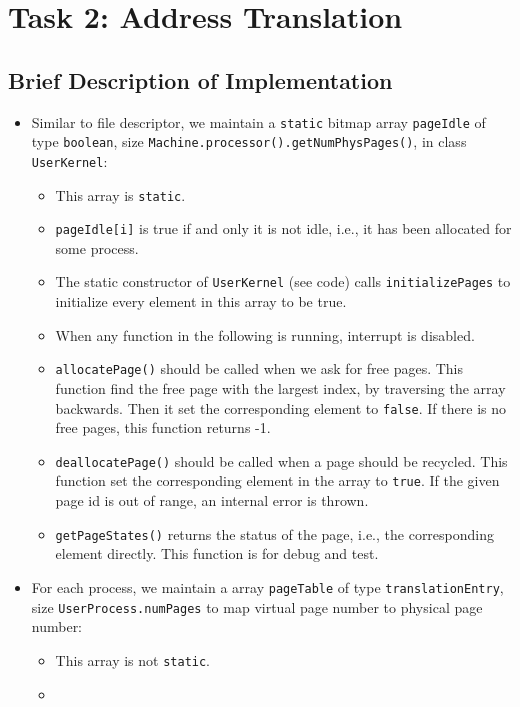 \documentclass{article}
\begin{document}
\section{Task 2: Address Translation}

\subsection{Brief Description of Implementation}

\begin{itemize}
\item
Similar to file descriptor, we maintain a \texttt{static} bitmap array \texttt{pageIdle} of type \texttt{boolean}, size \texttt{Machine.processor().getNumPhysPages()}, in class \texttt{UserKernel}:
	\begin{itemize}
	\item
	This array is \texttt{static}.
	\item
	\texttt{pageIdle[i]} is true if and only it is not idle, i.e., it has been allocated for some process.
	\item
	The static constructor of \texttt{UserKernel} (see code) calls \texttt{initializePages} to initialize every element in this array to be true.
	\item
	When any function in the following is running, interrupt is disabled.
	\item
	\texttt{allocatePage()} should be called when we ask for free pages.
	This function find the free page with the largest index, by traversing the array backwards. Then it set the corresponding element to \texttt{false}.
	If there is no free pages, this function returns -1.
	\item
	\texttt{deallocatePage()} should be called when a page should be recycled.
	This function set the corresponding element in the array to \texttt{true}.
	If the given page id is out of range, an internal error is thrown.
	\item
	\texttt{getPageStates()} returns the status of the page, i.e., the corresponding element directly.
	This function is for debug and test.
	\end{itemize}
\item
For each process, we maintain a array \texttt{pageTable} of type \texttt{translationEntry}, size \texttt{UserProcess.numPages} to map virtual page number to physical page number:
	\begin{itemize}
	\item
	This array is not \texttt{static}.
	\item

\end{itemize}
\end{itemize}
\end{document}
